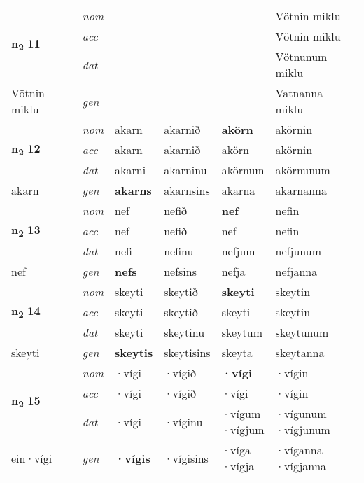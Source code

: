 \begin{longtable}[l]{X>{\footnotesize\itshape}XXXXX}
\multirow{3}{*}{{{\textbf{n{\textsubscript{2}}} \Large{\textbf{11}}}}} & nom &  &  & \textbf{} & Vötnin miklu \\*
 & acc &  &  &  & Vötnin miklu \\*
 & dat &  &  &  & Vötnunum miklu \\*
 {\footnotesize{Vötnin miklu}} & gen & \textbf{} &  &  & Vatnanna miklu \\
\midrule

\multirow{3}{*}{{{\textbf{n{\textsubscript{2}}} \Large{\textbf{12}}}}} & nom & akarn & akarnið & \textbf{akörn} & akörnin \\*
 & acc & akarn & akarnið & akörn & akörnin \\*
 & dat & akarni & akarninu & akörnum & akörnunum \\*
 {\footnotesize{akarn}} & gen & \textbf{akarns} & akarnsins & akarna & akarnanna \\
\midrule

\multirow{3}{*}{{{\textbf{n{\textsubscript{2}}} \Large{\textbf{13}}}}} & nom & nef & nefið & \textbf{nef} & nefin \\*
 & acc & nef & nefið & nef & nefin \\*
 & dat & nefi & nefinu & nefjum & nefjunum \\*
 {\footnotesize{nef}} & gen & \textbf{nefs} & nefsins & nefja & nefjanna \\
\midrule

\multirow{3}{*}{{{\textbf{n{\textsubscript{2}}} \Large{\textbf{14}}}}} & nom & skeyti & skeytið & \textbf{skeyti} & skeytin \\*
 & acc & skeyti & skeytið & skeyti & skeytin \\*
 & dat & skeyti & skeytinu & skeytum & skeytunum \\*
 {\footnotesize{skeyti}} & gen & \textbf{skeytis} & skeytisins & skeyta & skeytanna \\
\midrule

\multirow{3}{*}{{{\textbf{n{\textsubscript{2}}} \Large{\textbf{15}}}}} & nom & ·vígi & ·vígið & \textbf{·vígi} & ·vígin \\*
 & acc & ·vígi & ·vígið & ·vígi & ·vígin \\*
 & dat & ·vígi & ·víginu & \specialcell{·vígum\\  ·vígjum} & \specialcell{·vígunum\\  ·vígjunum} \\*
 {\footnotesize{ein\allowbreak ·vígi}} & gen & \textbf{·vígis} & ·vígisins & \specialcell{·víga\\  ·vígja} & \specialcell{·víganna\\  ·vígjanna} \\
\midrule


\end{longtable}
